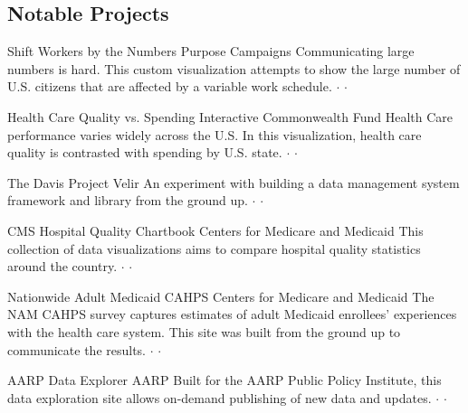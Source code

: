 \documentclass{article}
\begin{document}
\begin{paracol}{2}
  \begin{leftcolumn}

\section*{Notable Projects}

{Shift Workers by the Numbers}
{Purpose Campaigns}{%
Communicating large numbers is hard. This custom visualization attempts to show the large number of U.S. citizens that are affected by a variable work schedule.
 $\cdot$  $\cdot$ %
}

{Health Care Quality vs. Spending Interactive}
{Commonwealth Fund}{%
Health Care performance varies widely across the U.S. In this visualization, health care quality is contrasted with spending by U.S. state.
 $\cdot$  $\cdot$ %
}

{The Davis Project}
{Velir}{%
An experiment with building a data management system framework and library from the ground up. 
 $\cdot$  $\cdot$ %
}

{CMS Hospital Quality Chartbook}
{Centers for Medicare and Medicaid}{%
This collection of data visualizations aims to compare hospital quality statistics around the country.
 $\cdot$  $\cdot$ %
}

{Nationwide Adult Medicaid CAHPS}
{Centers for Medicare and Medicaid}{%
The NAM CAHPS survey captures estimates of adult Medicaid enrollees’ experiences with the health care system. This site was built from the ground up to communicate the results.
 $\cdot$  $\cdot$ %
}

{AARP Data Explorer}
{AARP}{%
Built for the AARP Public Policy Institute, this data exploration site allows on-demand publishing of new data and updates.
 $\cdot$  $\cdot$ %
}


\end{leftcolumn}
\end{paracol}
\end{document}
